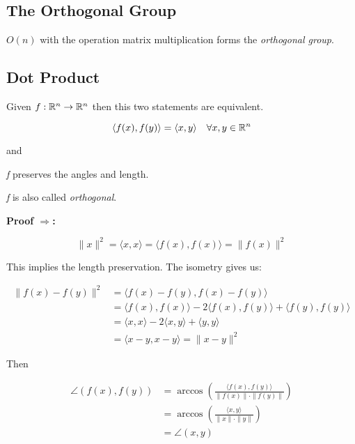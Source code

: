 \QED

\subsection{The Orthogonal Group}

\(O(n)\) with the operation matrix multiplication forms the \emph{orthogonal group}.
\vspace{\baselineskip}

\subsection{Dot Product}

Given \(f: \mathbb{R}^n \to \mathbb{R}^n\) then this two statements are equivalent.

\[
    \langle f(x), f(y) \rangle = \langle x, y \rangle \quad \forall x,y \in \mathbb{R}^n
\]

and 
\vspace{\baselineskip}

\emph{f} preserves the angles and length.
\vspace{\baselineskip}

\emph{f} is also called \emph{orthogonal}.
\vspace{\baselineskip}

\textbf{Proof \(\Rightarrow\):}
 
\[
    \|x\|^2 = \langle x, x \rangle = \langle f(x), f(x) \rangle = \|f(x)\|^2
\]

This implies the length preservation. The isometry gives us:

\begin{align*}
    \|f(x) - f(y)\|^2 
    &= \langle f(x) - f(y), f(x) - f(y) \rangle \\
    &= \langle f(x), f(x) \rangle - 2\langle f(x), f(y) \rangle + \langle f(y), f(y) \rangle \\
    &= \langle x, x \rangle - 2\langle x, y \rangle + \langle y, y \rangle \\
    &= \langle x - y, x - y \rangle = \|x - y\|^2
\end{align*}

Then

\begin{align*}
    \angle(f(x), f(y)) 
    &= \arccos\left( \frac{\langle f(x), f(y) \rangle}{\|f(x)\| \cdot \|f(y)\|} \right) \\
    &= \arccos\left( \frac{\langle x, y \rangle}{\|x\| \cdot \|y\|} \right) \\
    &= \angle(x, y)
\end{align*}

